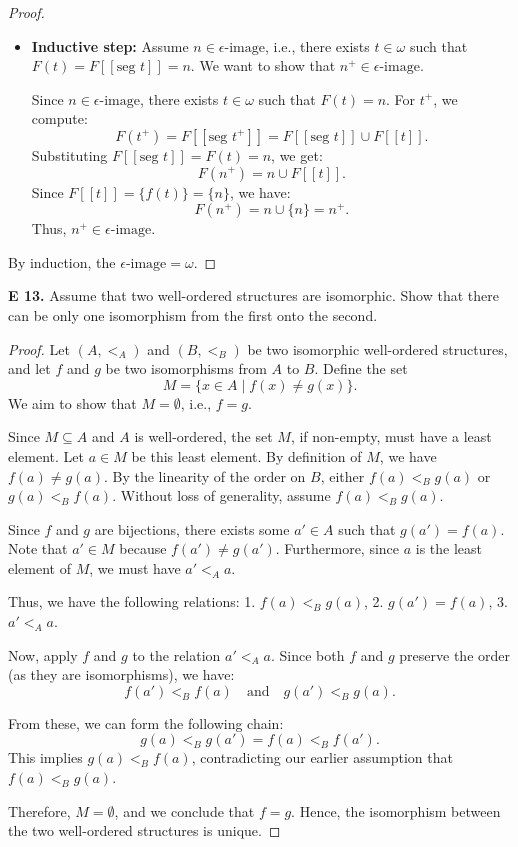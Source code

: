 \begin{proof}
\begin{itemize}
        \item \textbf{Inductive step:} Assume \(n \in \epsilon\text{-image}\), i.e., there exists \(t \in \omega\) such that \(F(t) = F[\![\text{seg } t]\!] = n\). We want to show that \(n^+ \in \epsilon\text{-image}\).

        Since \(n \in \epsilon\text{-image}\), there exists \(t \in \omega\) such that \(F(t) = n\). For \(t^+\), we compute:
        \[
        F(t^+) = F[\![\text{seg } t^+]\!] = F[\![\text{seg } t]\!] \cup F[\![t]\!].
        \]
        Substituting \(F[\![\text{seg } t]\!] = F(t) = n\), we get:
        \[
        F(n^+) = n \cup F[\![t]\!].
        \]
        Since \(F[\![t]\!] = \{f(t)\} = \{n\}\), we have:
        \[
        F(n^+) = n \cup \{n\} = n^+.
        \]
        Thus, \(n^+ \in \epsilon\text{-image}\).
    \end{itemize}

    By induction, the \(\epsilon\text{-image} = \omega\).

\end{proof}

\begin{question}
    \textbf{E 13.} Assume that two well-ordered structures are isomorphic. Show that there can be only one isomorphism from the first onto the second.
\end{question}
\begin{proof}
    Let \((A, <_A)\) and \((B, <_B)\) be two isomorphic well-ordered structures, and let \(f\) and \(g\) be two isomorphisms from \(A\) to \(B\). Define the set 
    \[
    M = \{x \in A \mid f(x) \neq g(x)\}.
    \]
    We aim to show that \(M = \emptyset\), i.e., \(f = g\).

    Since \(M \subseteq A\) and \(A\) is well-ordered, the set \(M\), if non-empty, must have a least element. Let \(a \in M\) be this least element. By definition of \(M\), we have \(f(a) \neq g(a)\). By the linearity of the order on \(B\), either \(f(a) <_B g(a)\) or \(g(a) <_B f(a)\). Without loss of generality, assume \(f(a) <_B g(a)\).

    Since \(f\) and \(g\) are bijections, there exists some \(a' \in A\) such that \(g(a') = f(a)\). Note that \(a' \in M\) because \(f(a') \neq g(a')\). Furthermore, since \(a\) is the least element of \(M\), we must have \(a' <_A a\).

    Thus, we have the following relations:
    1. \(f(a) <_B g(a)\),
    2. \(g(a') = f(a)\),
    3. \(a' <_A a\).

    Now, apply \(f\) and \(g\) to the relation \(a' <_A a\). Since both \(f\) and \(g\) preserve the order (as they are isomorphisms), we have:
    \[
    f(a') <_B f(a) \quad \text{and} \quad g(a') <_B g(a).
    \]

    From these, we can form the following chain:
    \[
    g(a) <_B g(a') = f(a) <_B f(a').
    \]
    This implies \(g(a) <_B f(a)\), contradicting our earlier assumption that \(f(a) <_B g(a)\).

    Therefore, \(M = \emptyset\), and we conclude that \(f = g\). Hence, the isomorphism between the two well-ordered structures is unique.

\end{proof}

